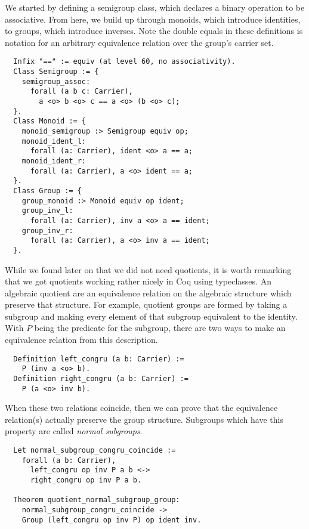 \documentclass{article}
\begin{document}
We started by defining a semigroup class, which declares a binary operation to
be associative. From here, we build up through monoids, which introduce
identities, to groups, which introduce inverses. Note the double equals in
these definitions is notation for an arbitrary equivalence relation over the
group's carrier set.
\begin{verbatim}
  Infix "==" := equiv (at level 60, no associativity).
  Class Semigroup := {
    semigroup_assoc:
      forall (a b c: Carrier),
        a <o> b <o> c == a <o> (b <o> c);
  }.
  Class Monoid := {
    monoid_semigroup :> Semigroup equiv op;
    monoid_ident_l:
      forall (a: Carrier), ident <o> a == a;
    monoid_ident_r:
      forall (a: Carrier), a <o> ident == a;
  }.
  Class Group := {
    group_monoid :> Monoid equiv op ident;
    group_inv_l:
      forall (a: Carrier), inv a <o> a == ident;
    group_inv_r:
      forall (a: Carrier), a <o> inv a == ident;
  }.
\end{verbatim}

While we found later on that we did not need quotients, it is worth remarking
that we got quotients working rather nicely in Coq using typeclasses. An
algebraic quotient are an equivalence relation on the algebraic structure which
preserve that structure. For example, quotient groups are formed by taking a
subgroup and making every element of that subgroup equivalent to the identity.
With \(P\) being the predicate for the subgroup, there are two ways to make an
equivalence relation from this description.
\begin{verbatim}
  Definition left_congru (a b: Carrier) :=
    P (inv a <o> b).
  Definition right_congru (a b: Carrier) :=
    P (a <o> inv b).
\end{verbatim}
When these two relations coincide, then we can prove that the equivalence
relation(s) actually preserve the group structure. Subgroups which have this
property are called \emph{normal subgroups}.
\begin{verbatim}
  Let normal_subgroup_congru_coincide :=
    forall (a b: Carrier),
      left_congru op inv P a b <->
      right_congru op inv P a b.

  Theorem quotient_normal_subgroup_group:
    normal_subgroup_congru_coincide ->
    Group (left_congru op inv P) op ident inv.
\end{verbatim}
\end{document}
